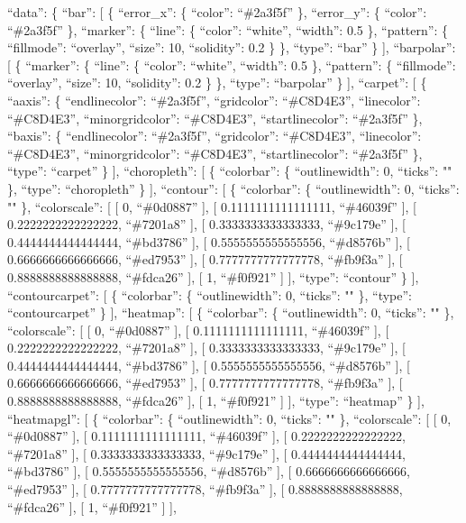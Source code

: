 \documentclass[
]{article}
\begin{document}
``data'': \{ ``bar'': {[} \{ ``error\_x'': \{ ``color'': ``\#2a3f5f''
\}, ``error\_y'': \{ ``color'': ``\#2a3f5f'' \}, ``marker'': \{
``line'': \{ ``color'': ``white'', ``width'': 0.5 \}, ``pattern'': \{
``fillmode'': ``overlay'', ``size'': 10, ``solidity'': 0.2 \} \},
``type'': ``bar'' \} {]}, ``barpolar'': {[} \{ ``marker'': \{ ``line'':
\{ ``color'': ``white'', ``width'': 0.5 \}, ``pattern'': \{
``fillmode'': ``overlay'', ``size'': 10, ``solidity'': 0.2 \} \},
``type'': ``barpolar'' \} {]}, ``carpet'': {[} \{ ``aaxis'': \{
``endlinecolor'': ``\#2a3f5f'', ``gridcolor'': ``\#C8D4E3'',
``linecolor'': ``\#C8D4E3'', ``minorgridcolor'': ``\#C8D4E3'',
``startlinecolor'': ``\#2a3f5f'' \}, ``baxis'': \{ ``endlinecolor'':
``\#2a3f5f'', ``gridcolor'': ``\#C8D4E3'', ``linecolor'': ``\#C8D4E3'',
``minorgridcolor'': ``\#C8D4E3'', ``startlinecolor'': ``\#2a3f5f'' \},
``type'': ``carpet'' \} {]}, ``choropleth'': {[} \{ ``colorbar'': \{
``outlinewidth'': 0, ``ticks'': "" \}, ``type'': ``choropleth'' \} {]},
``contour'': {[} \{ ``colorbar'': \{ ``outlinewidth'': 0, ``ticks'': ""
\}, ``colorscale'': {[} {[} 0, ``\#0d0887'' {]}, {[} 0.1111111111111111,
``\#46039f'' {]}, {[} 0.2222222222222222, ``\#7201a8'' {]}, {[}
0.3333333333333333, ``\#9c179e'' {]}, {[} 0.4444444444444444,
``\#bd3786'' {]}, {[} 0.5555555555555556, ``\#d8576b'' {]}, {[}
0.6666666666666666, ``\#ed7953'' {]}, {[} 0.7777777777777778,
``\#fb9f3a'' {]}, {[} 0.8888888888888888, ``\#fdca26'' {]}, {[} 1,
``\#f0f921'' {]} {]}, ``type'': ``contour'' \} {]}, ``contourcarpet'':
{[} \{ ``colorbar'': \{ ``outlinewidth'': 0, ``ticks'': "" \}, ``type'':
``contourcarpet'' \} {]}, ``heatmap'': {[} \{ ``colorbar'': \{
``outlinewidth'': 0, ``ticks'': "" \}, ``colorscale'': {[} {[} 0,
``\#0d0887'' {]}, {[} 0.1111111111111111, ``\#46039f'' {]}, {[}
0.2222222222222222, ``\#7201a8'' {]}, {[} 0.3333333333333333,
``\#9c179e'' {]}, {[} 0.4444444444444444, ``\#bd3786'' {]}, {[}
0.5555555555555556, ``\#d8576b'' {]}, {[} 0.6666666666666666,
``\#ed7953'' {]}, {[} 0.7777777777777778, ``\#fb9f3a'' {]}, {[}
0.8888888888888888, ``\#fdca26'' {]}, {[} 1, ``\#f0f921'' {]} {]},
``type'': ``heatmap'' \} {]}, ``heatmapgl'': {[} \{ ``colorbar'': \{
``outlinewidth'': 0, ``ticks'': "" \}, ``colorscale'': {[} {[} 0,
``\#0d0887'' {]}, {[} 0.1111111111111111, ``\#46039f'' {]}, {[}
0.2222222222222222, ``\#7201a8'' {]}, {[} 0.3333333333333333,
``\#9c179e'' {]}, {[} 0.4444444444444444, ``\#bd3786'' {]}, {[}
0.5555555555555556, ``\#d8576b'' {]}, {[} 0.6666666666666666,
``\#ed7953'' {]}, {[} 0.7777777777777778, ``\#fb9f3a'' {]}, {[}
0.8888888888888888, ``\#fdca26'' {]}, {[} 1, ``\#f0f921'' {]} {]},
\end{document}
